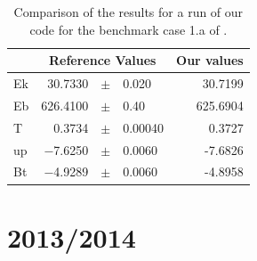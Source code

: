 \documentclass[a4paper,10pt]{book}
\begin{document}



\begin{table}
\centering
\begin{tabularx}{0.7\textwidth}{l|rcl|r}
   & \multicolumn{3}{c|}{Reference Values } & Our values \\\hline
Ek &  30.7330 &$\pm$& 0.020   & 30.7199\\
Eb & 626.4100 &$\pm$& 0.40    & 625.6904\\
T  &   0.3734 &$\pm$& 0.00040 &  0.3727\\
up &  −7.6250 &$\pm$& 0.0060  & -7.6826\\
Bt &  −4.9289 &$\pm$& 0.0060  & -4.8958
\end{tabularx}
\caption{Comparison of the results for a run of our code for the benchmark case
1.a of \citep{ChristensenEtAl01}.}
\end{table}


\section{2013/2014}



\end{document}
